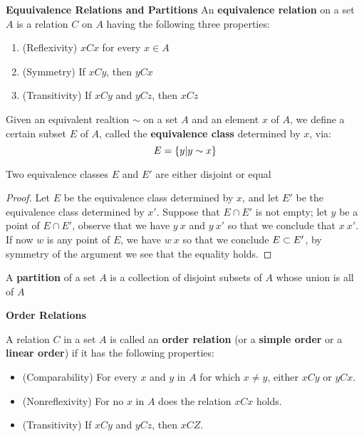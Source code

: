 \textbf{Equuivalence Relations and Partitions}
An \textbf{equivalence relation} on a set $A$ is a relation $C$ on $A$ having the following three properties:
\begin{enumerate}
	\item (Reflexivity) $xCx$ for every $ x \in A $
	\item (Symmetry) If $ xCy $, then $ yCx $ 
	\item (Transitivity) If $ xCy $ and $ yCz $, then $ xCz $
\end{enumerate}  

Given an equivalent realtion $ \sim $ on a set $A$ and an element $x$ of $A$, we define a certain subset $E$ of $A$, called the \textbf{equivalence class} determined by $x$, via:
\[ E = \left\lbrace y | y \sim x \right\rbrace \]

\begin{lem}
	Two equivalence classes $E$ and $E'$ are either disjoint or equal
\end{lem}

\begin{proof}
	Let $E$ be the equivalence class determined by $x$, and let $E'$ be the equivalence class determined by $x'$. Suppose that $ E \cap E'$ is not empty; let $y$ be a point of $ E \cap E'$, observe that we have $ y ~ x $ and $ y ~ x'$ so  that we conclude that $ x ~ x'$. If now $w$ is any point of $E$, we have $w ~ x$ so that we conclude $E \subset E'$, by symmetry of the argument we see that the equality holds.
\end{proof}

\begin{defn}
	A \textbf{partition} of a set $A$ is a collection of disjoint subsets of $A$ whose union is all of $A$
\end{defn}

\textbf{Order Relations}

A relation $C$ in a set $A$ is called an \textbf{order relation} (or a \textbf{simple order} or a \textbf{linear order}) if it has the following properties:

\begin{itemize}
	\item (Comparability) For every $x$ and $y$ in $A$ for which $ x \neq y$, either $ xCy$ or $yCx$.
	\item (Nonreflexivity) For no $x$ in $A$ does the relation $xCx$ holds.
	\item (Transitivity) If $xCy$ and $yCz$, then $xCZ$.
\end{itemize}

